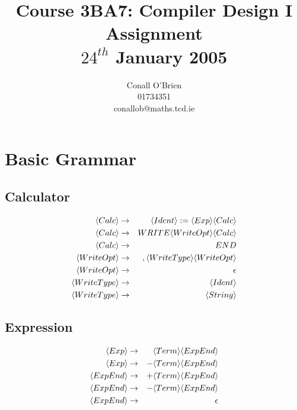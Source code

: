 \documentclass[a4paper,12pt]{article}
\newcommand{\nonterminal}[1]{\langle #1 \rangle}
\begin{document}
\title{Course 3BA7: Compiler Design I \\ Assignment \\	$24^{th}$ January 2005}

\author{Conall O'Brien \\ 01734351 \\ conallob@maths.tcd.ie}

\maketitle

\section{Basic Grammar}

\subsection*{Calculator}

\begin{eqnarray}
\setcounter{equation}{1}
\nonterminal{Calc} 		&	\to	&	 \nonterminal{Ident} := \nonterminal{Exp} \nonterminal{Calc}	\\
\nonterminal{Calc} 		&	\to	&	 WRITE \nonterminal{WriteOpt} \nonterminal{Calc}	\\
\nonterminal{Calc} 		&	\to	&	 END	\\
\nonterminal{WriteOpt} 	& 	\to	&	 , \nonterminal{WriteType} \nonterminal{WriteOpt}	\\
\nonterminal{WriteOpt} 	& 	\to	&	 \epsilon	\\
\nonterminal{WriteType} & 	\to	&	 \nonterminal{Ident}		\\
\nonterminal{WriteType} & 	\to	&	 \nonterminal{String}
\end{eqnarray}

\subsection*{Expression}
                            
\begin{eqnarray}
\setcounter{equation}{1}
\nonterminal{Exp} 		&	\to	&	 \nonterminal{Term} \nonterminal{ExpEnd}	\\
\nonterminal{Exp} 		&	\to	&	 - \nonterminal{Term} \nonterminal{ExpEnd}	\\
\nonterminal{ExpEnd} 	&	\to	&	 + \nonterminal{Term} \nonterminal{ExpEnd}	\\
\nonterminal{ExpEnd} 	&	\to	&	 - \nonterminal{Term} \nonterminal{ExpEnd}	\\
\nonterminal{ExpEnd} 	&	\to	&	 \epsilon	
\end{eqnarray}
\end{document}
